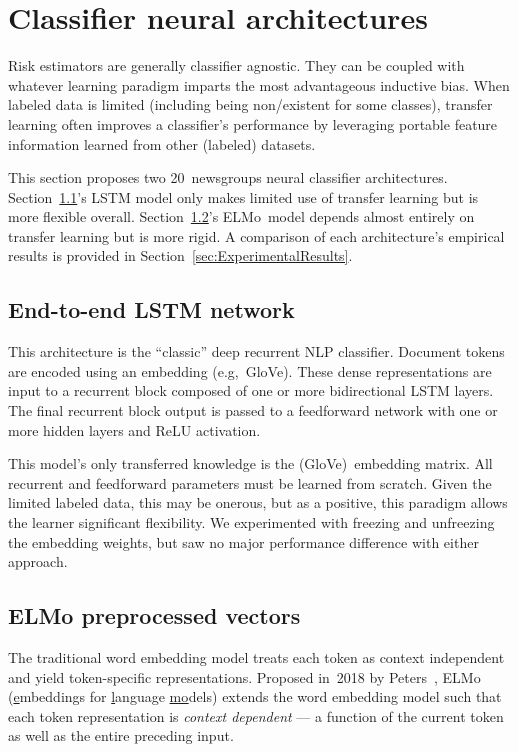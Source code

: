 \section{Classifier neural architectures}\label{sec:Architectures}

Risk estimators are generally classifier agnostic.  They can be coupled with whatever learning paradigm imparts the most advantageous inductive bias. When labeled data is limited (including being non\-/existent for some classes), transfer learning often improves a classifier's performance by leveraging portable feature information learned from other (labeled) datasets.

This section proposes two 20~newsgroups neural classifier architectures.  Section~\ref{sec:Architectures:LSTM}'s LSTM model only makes limited use of transfer learning but is more flexible overall.  Section~\ref{sec:Architectures:ELMo}'s ELMo~model depends almost entirely on transfer learning but is more rigid. A comparison of each architecture's empirical results is provided in Section~\ref{sec:ExperimentalResults}.

\subsection{End-to-end LSTM network}\label{sec:Architectures:LSTM}

This architecture is the ``classic'' deep recurrent NLP classifier. Document tokens are encoded using an embedding (e.g,~GloVe). These dense representations are input to a recurrent block composed of one or more bidirectional LSTM layers.  The final recurrent block output is passed to a feedforward network with one or more hidden layers and ReLU activation.

This model's only transferred knowledge is the (GloVe)~embedding matrix. All recurrent and feedforward parameters must be learned from scratch.  Given the limited labeled data, this may be onerous, but as a positive, this paradigm allows the learner significant flexibility.  We experimented with freezing and unfreezing the embedding weights, but saw no major performance difference with either approach.

\subsection{ELMo preprocessed vectors}\label{sec:Architectures:ELMo}

The traditional word embedding model treats each token as context independent and yield token-specific representations. Proposed in~2018 by Peters\etal~\cite{Peters:2018}, ELMo (\underline{e}mbeddings for \underline{l}anguage \underline{mo}dels) extends the word embedding model such that each token representation is \textit{context dependent} --- a function of the current token as well as the entire preceding input.


